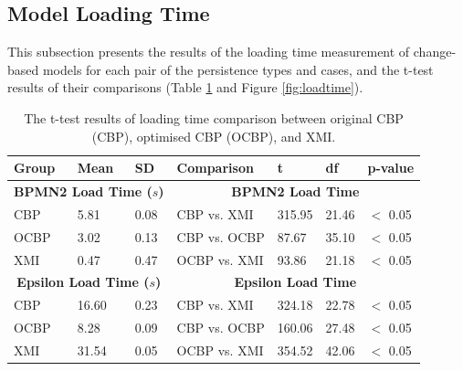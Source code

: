 \documentclass{llncs}
\begin{document}
{\vspace{-10pt}
\subsection{Model Loading Time}
\label{subsec:loading_time_test}

\vspace{-10pt}
 This subsection presents the results of the loading time measurement of change-based models for each pair of the persistence types and cases, and the t-test results of their comparisons (Table \ref{table:ttest_results_loadtime} and Figure \ref{fig:loadtime}). 
 
 \vspace{-20pt}
 \begin{table}[ht]
     \footnotesize
     \centering
     \caption{The t-test results of loading time comparison between original CBP (CBP), optimised CBP (OCBP), and XMI.}
     \label{table:ttest_results_loadtime}
     \begin{tabular}
         {|p{}p{}p{}|p{}p{}p{}p{}|}
         \hline 
         Group & Mean & SD & Comparison & t  & df & p-value \\  
         \hline 
         \multicolumn{3}{|c|}{\textbf{BPMN2 Load Time ($s$)}} & \multicolumn{4}{c|}{\textbf{BPMN2 Load Time}} \\ 
         CBP & 5.81 & 0.08 & CBP vs. XMI & 315.95    &21.46 & $<$ 0.05 \\  
         OCBP & 3.02 & 0.13 & CBP vs. OCBP & 87.67 & 35.10  & $<$ 0.05 \\  
         XMI & 0.47 & 0.47 & OCBP vs. XMI & 93.86    & 21.18  & $<$ 0.05 \\ 
         \hline 
         
         \multicolumn{3}{|c|}{\textbf{Epsilon Load Time ($s$)}} & \multicolumn{4}{c|}{\textbf{Epsilon Load Time}} \\
         CBP & 16.60    & 0.23 &  CBP vs. XMI & 324.18   &22.78 & $<$ 0.05 \\
         OCBP &  8.28  &  0.09 & CBP vs. OCBP & 160.06 & 27.48 & $<$ 0.05 \\  
         XMI & 31.54   & 0.05 & OCBP vs. XMI & 354.52   &42.06  & $<$ 0.05 \\ 
         \hline 
         

\end{tabular}
\end{table}}
\end{document}
